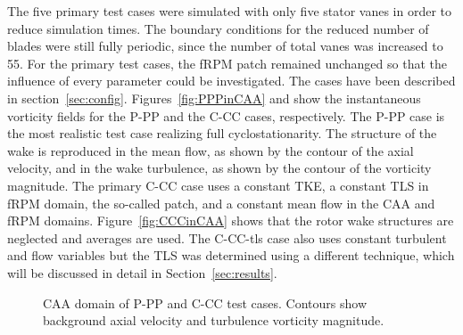 The five primary test cases were simulated with only five stator vanes in order to reduce simulation times.  The boundary conditions for the reduced number of blades were still fully periodic, since the number of total vanes was increased to 55. For the primary test cases, the fRPM patch remained unchanged so that the influence of every parameter could be investigated.  The cases have been described in section~\ref{sec:config}. Figures~\ref{fig:PPPinCAA} and  show the instantaneous vorticity fields for the P-PP and the C-CC cases, respectively. The P-PP case is the most realistic test case realizing full cyclostationarity. The structure of the wake is reproduced in the mean flow, as shown by the contour of the axial velocity, and in the wake turbulence, as shown by the contour of the vorticity magnitude. The primary C-CC case uses a constant TKE, a constant TLS in fRPM domain, the so-called patch, and a constant mean flow in the CAA and fRPM domains.  Figure~\ref{fig:CCCinCAA} shows that the rotor wake structures are neglected and averages are used.  The C-CC-tls case also uses constant turbulent and flow variables but the TLS was determined using a different technique, which will be discussed in detail in Section~\ref{sec:results}.

\begin{figure}
	\caption{CAA domain of P-PP and C-CC test cases.  Contours show background axial velocity and turbulence vorticity magnitude.\label{fig:PPPCCCinCAA}}
\end{figure}

